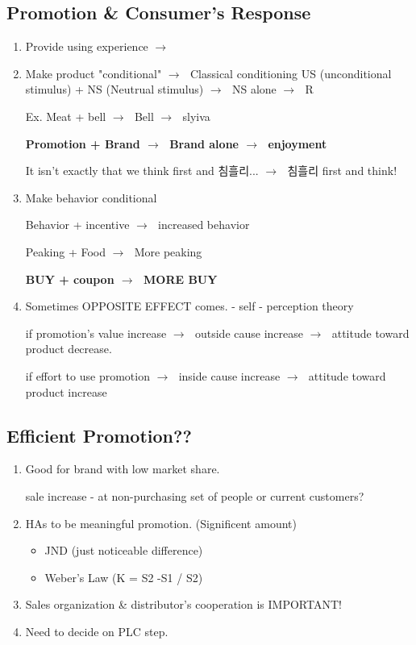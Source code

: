 \documentclass[12pt]{article}
\newcommand{\ra}{$\rightarrow \text{ }$}
\newcommand{\tb}{\textbf}
\begin{document}
\begin{itemize}
\subsection{Promotion \& Consumer's Response}

\begin{enumerate}
	\item Provide using experience \ra

	\item Make product "conditional" \ra Classical conditioning
	US (unconditional stimulus) + NS (Neutrual stimulus) \ra NS alone \ra R

	Ex. Meat + bell \ra Bell \ra slyiva

	\tb{Promotion + Brand \ra Brand alone \ra enjoyment }

	It isn't exactly that we think first and 침흘리... \ra 침흘리 first and think!
	\item Make behavior conditional

	Behavior + incentive \ra increased behavior

	Peaking + Food \ra More peaking

	\tb{BUY + coupon \ra MORE BUY}


	\item Sometimes OPPOSITE EFFECT comes. - self - perception theory

	if promotion's value increase \ra outside cause increase \ra attitude toward product decrease.

	if effort to use promotion \ra inside cause increase \ra attitude toward product increase

\end{enumerate}

\subsection{Efficient Promotion??}

\begin{enumerate}
	\item Good for brand with low market share.

	sale increase - at non-purchasing set of people or current customers?

	\item HAs to be meaningful promotion. (Significent amount)
	\begin{itemize}
		\item JND (just noticeable difference)
		\item Weber's Law (K = S2 -S1 / S2)
	\end{itemize}
	\item Sales organization & distributor's cooperation is IMPORTANT!
	\item Need to decide on PLC step.
\end{enumerate}


\end{itemize}
\end{document}

